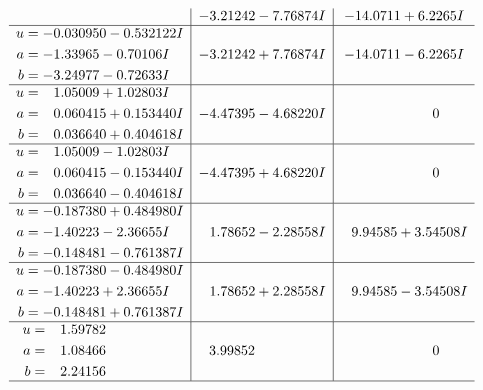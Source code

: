 \documentclass[1p]{elsarticle_modified}
\theoremstyle{definition}
\begin{document}
$$\begin{array}{c|c|c}
 & -3.21242 - 7.76874 I & -14.0711 + 6.2265 I \\ \hline\begin{aligned}
u &= -0.030950 - 0.532122 I \\
a &= -1.33965 - 0.70106 I \\
b &= -3.24977 - 0.72633 I\end{aligned}
 & -3.21242 + 7.76874 I & -14.0711 - 6.2265 I \\ \hline\begin{aligned}
u &= \phantom{-}1.05009 + 1.02803 I \\
a &= \phantom{-}0.060415 + 0.153440 I \\
b &= \phantom{-}0.036640 + 0.404618 I\end{aligned}
 & -4.47395 - 4.68220 I & \phantom{-0.000000 } 0 \\ \hline\begin{aligned}
u &= \phantom{-}1.05009 - 1.02803 I \\
a &= \phantom{-}0.060415 - 0.153440 I \\
b &= \phantom{-}0.036640 - 0.404618 I\end{aligned}
 & -4.47395 + 4.68220 I & \phantom{-0.000000 } 0 \\ \hline\begin{aligned}
u &= -0.187380 + 0.484980 I \\
a &= -1.40223 - 2.36655 I \\
b &= -0.148481 - 0.761387 I\end{aligned}
 & \phantom{-}1.78652 - 2.28558 I & \phantom{-}9.94585 + 3.54508 I \\ \hline\begin{aligned}
u &= -0.187380 - 0.484980 I \\
a &= -1.40223 + 2.36655 I \\
b &= -0.148481 + 0.761387 I\end{aligned}
 & \phantom{-}1.78652 + 2.28558 I & \phantom{-}9.94585 - 3.54508 I \\ \hline\begin{aligned}
u &= \phantom{-}1.59782\phantom{ +0.000000I} \\
a &= \phantom{-}1.08466\phantom{ +0.000000I} \\
b &= \phantom{-}2.24156\phantom{ +0.000000I}\end{aligned}
 & \phantom{-}3.99852\phantom{ +0.000000I} & \phantom{-0.000000 } 0\\
 \hline 
 \end{array}$$\newpage
\newpage\renewcommand{\arraystretch}{1}
\end{document}
